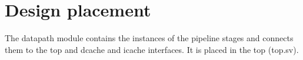 \section{Design placement}
\label{chapter2}

The datapath module contains the instances of the pipeline stages and connects them to the top and dcache and icache interfaces. It is placed in the top (top.sv).



